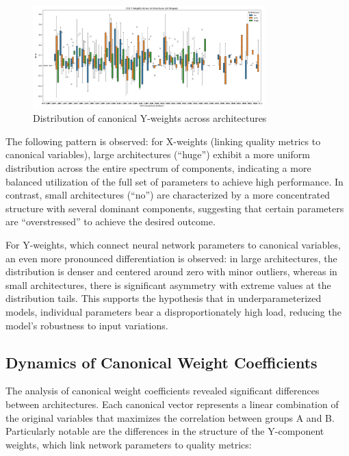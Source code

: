 \documentclass[a4paper,12pt]{article}
\begin{document}
\begin{figure}[ht]
  \centering
  \includegraphics[width=0.8\textwidth]{resources_en/cca_y_weights_all_shapes.pdf}
  \caption{Distribution of canonical Y-weights across architectures}
  \label{fig:cca_y_weights}
\end{figure}

The following pattern is observed: for X-weights (linking quality metrics to canonical variables), large
architectures (``huge'') exhibit a more uniform distribution across the entire spectrum of components,
indicating a more balanced utilization of the full set of parameters to achieve high performance. In
contrast, small architectures (``no'') are characterized by a more concentrated structure with several
dominant components, suggesting that certain parameters are ``overstressed'' to achieve the desired outcome.

For Y-weights, which connect neural network parameters to canonical variables, an even more pronounced
differentiation is observed: in large architectures, the distribution is denser and centered around zero with
minor outliers, whereas in small architectures, there is significant asymmetry with extreme values at the
distribution tails. This supports the hypothesis that in underparameterized models, individual parameters
bear a disproportionately high load, reducing the model's robustness to input variations.

\subsection{Dynamics of Canonical Weight Coefficients}

The analysis of canonical weight coefficients revealed significant differences between architectures. Each
canonical vector represents a linear combination of the original variables that maximizes the correlation
between groups A and B. Particularly notable are the differences in the structure of the Y-component weights,
which link network parameters to quality metrics:
\end{document}
